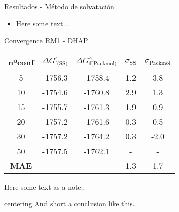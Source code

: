 \documentclass[aspectratio=169, hyperref={pdfpagelabels=false}]{beamer}
\begin{document}
\begin{frame}{Resultados - Método de solvatación}
\fontsize{8pt}{10pt}\selectfont
\begin{itemize}
\item Here some text...
\end{itemize}
\centering

\hfill{}

\begin{threeparttable}
\caption{Convergence RM1 - DHAP}
\begin{tabular}{ccccc}\toprule
nºconf & $\Delta G^\circ_{\text{f(SS)}}$ & $\Delta G^\circ_{\text{f(Packmol)}}$ & $\sigma_{\text{SS}}$ & $\sigma_{\text{Packmol}}$ \\  \midrule
5 & -1756.3 & -1758.4 & 1.2 & 3.8 \\  
10 & -1754.6 & -1760.8 & 2.9 & 1.3 \\  
15 & -1755.7 & -1761.3 & 1.9 & 0.9 \\  
20 & -1757.2 & -1761.6 & 0.3 & 0.5 \\  
30 & -1757.2 & -1764.2 & 0.3 & -2.0 \\  
50 & -1757.5 & -1762.1 & - & - \\ 
\textbf{MAE} &  &  & 1.3 & 1.7 \\ \bottomrule
\end{tabular}
\begin{tablenotes}
\footnotesize
\item {Here some text as a note..}
\end{tablenotes}
\end{threeparttable}

centering And short a conclusion like this...
\end{frame}
\end{document}

